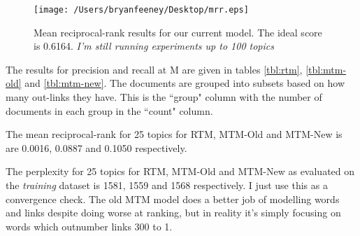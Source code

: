 \begin{figure}
  \centering
    \texttt{[image: /Users/bryanfeeney/Desktop/mrr.eps]}
  \caption{Mean reciprocal-rank results for our current model. The ideal score is 0.6164. \emph{I'm still running experiments up to 100 topics}}\label{fig:mrr}
\end{figure}

The results for precision and recall at M are given in tables \ref{tbl:rtm}, \ref{tbl:mtm-old} and \ref{tbl:mtm-new}. The documents are grouped into subsets based on how many out-links they have. This is the ``group" column with the number of documents in each group in the ``count" column.

The mean reciprocal-rank for 25 topics for RTM, MTM-Old and MTM-New is are 0.0016, 0.0887 and 0.1050 respectively.

The perplexity for 25 topics for RTM, MTM-Old and MTM-New as evaluated on the \emph{training} dataset is 1581, 1559 and 1568 respectively. I just use this as a convergence check. The old MTM model does a better job of modelling words and links despite doing worse at ranking, but in reality it's simply focusing on words which outnumber links 300 to 1.

